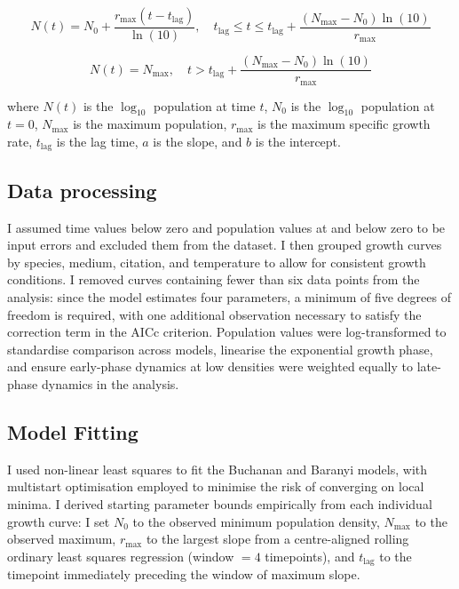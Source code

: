 \documentclass[11pt]{article}
\begin{document}
\begin{equation}
N(t) = N_0 + \dfrac{r_{\text{max}}(t - t_{\text{lag}})}{\ln(10)}, \quad
t_{\text{lag}} \le t \le t_{\text{lag}} + \dfrac{(N_{\text{max}} - N_0)\ln(10)}{r_{\text{max}}}
\end{equation}

\begin{equation}
N(t) = N_{\text{max}}, \quad
t > t_{\text{lag}} + \dfrac{(N_{\text{max}} - N_0)\ln(10)}{r_{\text{max}}}
\label{eq:buchanan}
\end{equation}

\noindent where $N(t)$ is the $\log_{10}$ population at time $t$, $N_0$ is the $\log_{10}$ 
population at $t = 0$, $N_{\text{max}}$ is the maximum population, $r_{\text{max}}$ is the 
maximum specific growth rate, $t_{\text{lag}}$ is the lag time, $a$ is the slope, and $b$ is the intercept.



\subsection{Data processing}

I assumed time values below zero and population values at and below zero to be input errors 
and excluded them from the dataset. I then grouped growth curves by species, medium, 
citation, and temperature to allow for consistent growth conditions. I removed curves 
containing fewer than six data points from the analysis: since the model estimates four 
parameters, a minimum of five degrees of freedom is required, with one additional 
observation necessary to satisfy the correction term in the AICc criterion. Population values were log-transformed to standardise comparison across models, linearise the exponential growth phase, and ensure early-phase dynamics at low densities were weighted equally to late-phase dynamics in the analysis.
\subsection{Model Fitting}

I used non-linear least squares to fit the Buchanan and Baranyi models, with 
multistart optimisation employed to minimise the risk of converging on local 
minima. I derived starting parameter bounds empirically from each individual 
growth curve: I set $N_0$ to the observed minimum population density, 
$N_{\max}$ to the observed maximum, $r_{\max}$ to the largest slope from a 
centre-aligned rolling ordinary least squares regression (window $= 4$ 
timepoints), and $t_{\text{lag}}$ to the timepoint immediately preceding the 
window of maximum slope.
\end{document}

